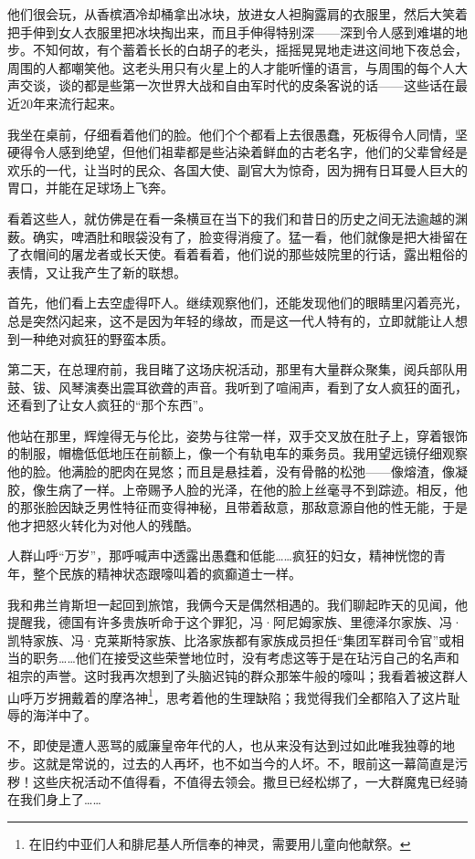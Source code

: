 \documentclass[UTF8]{ctexart}
\begin{document}
他们很会玩，从香槟酒冷却桶拿出冰块，放进女人袒胸露肩的衣服里，然后大笑着把手伸到女人衣服里把冰块掏出来，而且手伸得特别深——深到令人感到难堪的地步。不知何故，有个蓄着长长的白胡子的老头，摇摇晃晃地走进这间地下夜总会，周围的人都嘲笑他。这老头用只有火星上的人才能听懂的语言，与周围的每个人大声交谈，谈的都是些第一次世界大战和自由军时代的皮条客说的话——这些话在最近20年来流行起来。

我坐在桌前，仔细看着他们的脸。他们个个都看上去很愚蠢，死板得令人同情，坚硬得令人感到绝望，但他们祖辈都是些沾染着鲜血的古老名字，他们的父辈曾经是欢乐的一代，让当时的民众、各国大使、副官大为惊奇，因为拥有日耳曼人巨大的胃口，并能在足球场上飞奔。

看着这些人，就仿佛是在看一条横亘在当下的我们和昔日的历史之间无法逾越的渊薮。确实，啤酒肚和眼袋没有了，脸变得消瘦了。猛一看，他们就像是把大褂留在了衣帽间的屠龙者或长天使。看着看着，他们说的那些妓院里的行话，露出粗俗的表情，又让我产生了新的联想。

首先，他们看上去空虚得吓人。继续观察他们，还能发现他们的眼睛里闪着亮光，总是突然闪起来，这不是因为年轻的缘故，而是这一代人特有的，立即就能让人想到一种绝对疯狂的野蛮本质。

第二天，在总理府前，我目睹了这场庆祝活动，那里有大量群众聚集，阅兵部队用鼓、钹、风琴演奏出震耳欲聋的声音。我听到了喧闹声，看到了女人疯狂的面孔，还看到了让女人疯狂的“那个东西”。

他站在那里，辉煌得无与伦比，姿势与往常一样，双手交叉放在肚子上，穿着银饰的制服，帽檐低低地压在前额上，像一个有轨电车的乘务员。我用望远镜仔细观察他的脸。他满脸的肥肉在晃悠；而且是悬挂着，没有骨骼的松弛——像熔渣，像凝胶，像生病了一样。上帝赐予人脸的光泽，在他的脸上丝毫寻不到踪迹。相反，他的那张脸因缺乏男性特征而变得神秘，且带着敌意，那敌意源自他的性无能，于是他才把怒火转化为对他人的残酷。

人群山呼“万岁”，那呼喊声中透露出愚蠢和低能……疯狂的妇女，精神恍惚的青年，整个民族的精神状态跟嚎叫着的疯癫道士一样。

我和弗兰肯斯坦一起回到旅馆，我俩今天是偶然相遇的。我们聊起昨天的见闻，他提醒我，德国有许多贵族听命于这个罪犯，冯·阿尼姆家族、里德泽尔家族、冯·凯特家族、冯·克莱斯特家族、比洛家族都有家族成员担任“集团军群司令官”或相当的职务……他们在接受这些荣誉地位时，没有考虑这等于是在玷污自己的名声和祖宗的声誉。这时我再次想到了头脑迟钝的群众那笨牛般的嚎叫；我看着被这群人山呼万岁拥戴着的摩洛神\footnote{在旧约中亚们人和腓尼基人所信奉的神灵，需要用儿童向他献祭。}，思考着他的生理缺陷；我觉得我们全都陷入了这片耻辱的海洋中了。

不，即使是遭人恶骂的威廉皇帝年代的人，也从来没有达到过如此唯我独尊的地步。这就是常说的，过去的人再坏，也不如当今的人坏。不，眼前这一幕简直是污秽！这些庆祝活动不值得看，不值得去领会。撒旦已经松绑了，一大群魔鬼已经骑在我们身上了……
\end{document}
